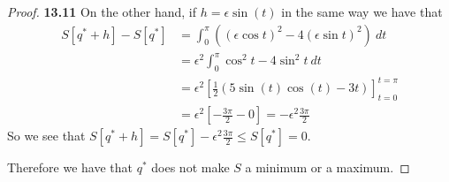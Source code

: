 \documentclass[11pt]{article}
\theoremstyle{definition}
\begin{document}
\begin{proof}{\textbf{13.11}}
    On the other hand, if $h = \epsilon \sin(t)$ in the same way we have that
    \begin{align*}
        S[q^* + h] - S[q^*] 
        &= \int_0^\pi \left((\epsilon\cos t)^2 - 4(\epsilon\sin t)^2 \right)~dt\\
        &= \epsilon^2\int_0^\pi \cos^2 t - 4\sin^2 t~dt\\
        &= \epsilon^2\left[\frac{1}{2}(5\sin(t)\cos(t) - 3t)\right]_{t=0}^{t=\pi}\\
        &= \epsilon^2\left[-\frac{3\pi}{2} - 0\right] = -\epsilon^2\frac{3\pi}{2}
    \end{align*}
    So we see that $S[q^* + h] = S[q^*] -\epsilon^2\frac{3\pi}{2} \leq S[q^*] = 0$.
    
    Therefore we have that $q^*$ does not make $S$ a minimum or a maximum.
\end{proof}
\cleardoublepage
\end{document}

